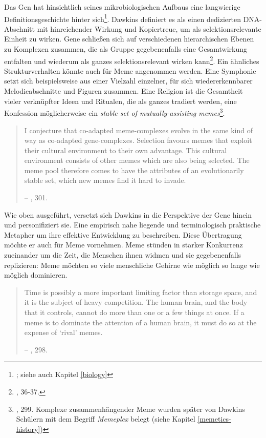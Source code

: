 \documentclass[openany,twoside,twocolumn]{book}
\let\rmarkdownfootnote\footnote%
\def\footnote{\protect\rmarkdownfootnote}
\begin{document}
Das Gen hat hinsichtlich seines mikrobiologischen Aufbaus eine
langwierige Definitionsgeschichte hinter sich\footnote{\textcite{gerstein_what_2007};
  siehe auch Kapitel \ref{biology}}. Dawkins definiert es als einen
dedizierten DNA-Abschnitt mit hinreichender Wirkung und Kopiertreue, um
als selektionsrelevante Einheit zu wirken. Gene schließen sich auf
verschiedenen hierarchischen Ebenen zu Komplexen zusammen, die als
Gruppe gegebenenfalls eine Gesamtwirkung entfalten und wiederum als
ganzes selektionsrelevant wirken kann\footnote{\textcite{Dawkinsselfishgene40th2016},
  36-37.}. Ein ähnliches Strukturverhalten könnte auch für Meme
angenommen werden. Eine Symphonie setzt sich beispielsweise aus einer
Vielzahl einzelner, für sich wiedererkennbarer Melodieabschnitte und
Figuren zusammen. Eine Religion ist die Gesamtheit vieler verknüpfter
Ideen und Ritualen, die als ganzes tradiert werden, eine Konfession
möglicherweise ein \emph{stable set of mutually-assisting
memes}\footnote{\textcite{Dawkinsselfishgene40th2016}, 299. Komplexe
  zusammenhängender Meme wurden später von Dawkins Schülern mit dem
  Begriff \emph{Memeplex} belegt (siehe Kapitel \ref{memetics-history})}.

\begin{quote}
I conjecture that co-adapted meme-complexes evolve in the same kind of
way as co-adapted gene-complexes. Selection favours memes that exploit
their cultural environment to their own advantage. This cultural
environment consists of other memes which are also being selected. The
meme pool therefore comes to have the attributes of an evolutionarily
stable set, which new memes find it hard to invade.

-- \textcite{Dawkinsselfishgene40th2016}, 301.
\end{quote}

Wie oben ausgeführt, versetzt sich Dawkins in die Perspektive der Gene
hinein und personifiziert sie. Eine empirisch nahe liegende und
terminologisch praktische Metapher um ihre effektive Entwicklung zu
beschreiben. Diese Übertragung möchte er auch für Meme vornehmen. Meme
stünden in starker Konkurrenz zueinander um die Zeit, die Menschen ihnen
widmen und sie gegebenenfalls replizieren: Meme möchten so viele
menschliche Gehirne wie möglich so lange wie möglich dominieren.

\begin{quote}
Time is possibly a more important limiting factor than storage space,
and it is the subject of heavy competition. The human brain, and the
body that it controls, cannot do more than one or a few things at once.
If a meme is to dominate the attention of a human brain, it must do so
at the expense of `rival' memes.

-- \textcite{Dawkinsselfishgene40th2016}, 298.
\end{quote}
\end{document}
